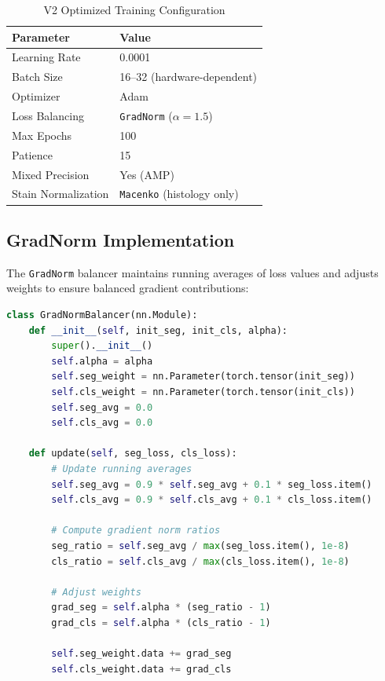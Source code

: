 \documentclass[11pt,a4paper,twoside]{report}
\newcommand{\model}[1]{\texttt{#1}}
\begin{document}
\begin{table}[htbp]
\centering
\caption{V2 Optimized Training Configuration}
\label{tab:v2_config}
\begin{tabular}{ll}
\toprule
\textbf{Parameter} & \textbf{Value} \\
\midrule
Learning Rate & 0.0001 \\
Batch Size & 16--32 (hardware-dependent) \\
Optimizer & Adam \\
Loss Balancing & \model{GradNorm} ($\alpha = 1.5$) \\
Max Epochs & 100 \\
Patience & 15 \\
Mixed Precision & Yes (AMP) \\
Stain Normalization & \model{Macenko} (histology only) \\
\bottomrule
\end{tabular}
\end{table}

\subsection{GradNorm Implementation}

The \model{GradNorm} balancer maintains running averages of loss values and adjusts weights to ensure balanced gradient contributions:

\begin{lstlisting}[language=Python, caption=GradNorm balancer]
class GradNormBalancer(nn.Module):
    def __init__(self, init_seg, init_cls, alpha):
        super().__init__()
        self.alpha = alpha
        self.seg_weight = nn.Parameter(torch.tensor(init_seg))
        self.cls_weight = nn.Parameter(torch.tensor(init_cls))
        self.seg_avg = 0.0
        self.cls_avg = 0.0
    
    def update(self, seg_loss, cls_loss):
        # Update running averages
        self.seg_avg = 0.9 * self.seg_avg + 0.1 * seg_loss.item()
        self.cls_avg = 0.9 * self.cls_avg + 0.1 * cls_loss.item()
        
        # Compute gradient norm ratios
        seg_ratio = self.seg_avg / max(seg_loss.item(), 1e-8)
        cls_ratio = self.cls_avg / max(cls_loss.item(), 1e-8)
        
        # Adjust weights
        grad_seg = self.alpha * (seg_ratio - 1)
        grad_cls = self.alpha * (cls_ratio - 1)
        
        self.seg_weight.data += grad_seg
        self.cls_weight.data += grad_cls
\end{lstlisting}
\end{document}
